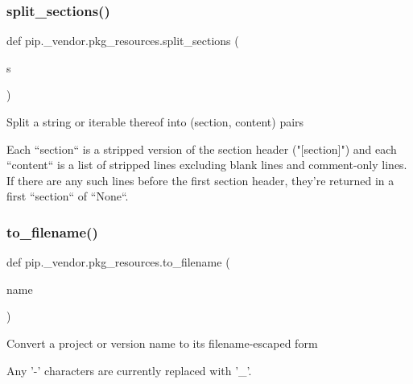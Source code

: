 \subsubsection{\texorpdfstring{split\+\_\+sections()}{split\_sections()}}
{\footnotesize\ttfamily def pip.\+\_\+vendor.\+pkg\+\_\+resources.\+split\+\_\+sections (\begin{DoxyParamCaption}\item[{}]{s }\end{DoxyParamCaption})}

\begin{DoxyVerb}Split a string or iterable thereof into (section, content) pairs

Each ``section`` is a stripped version of the section header ("[section]")
and each ``content`` is a list of stripped lines excluding blank lines and
comment-only lines.  If there are any such lines before the first section
header, they're returned in a first ``section`` of ``None``.
\end{DoxyVerb}
 \mbox{\label{namespacepip_1_1__vendor_1_1pkg__resources_a8984c165a48e88fd761aded34bc3290e}} 
\subsubsection{\texorpdfstring{to\+\_\+filename()}{to\_filename()}}
{\footnotesize\ttfamily def pip.\+\_\+vendor.\+pkg\+\_\+resources.\+to\+\_\+filename (\begin{DoxyParamCaption}\item[{}]{name }\end{DoxyParamCaption})}

\begin{DoxyVerb}Convert a project or version name to its filename-escaped form

Any '-' characters are currently replaced with '_'.
\end{DoxyVerb}
 \mbox{\label{namespacepip_1_1__vendor_1_1pkg__resources_a9154cf7836eab6cbeb1238fdc578e0fd}} 
